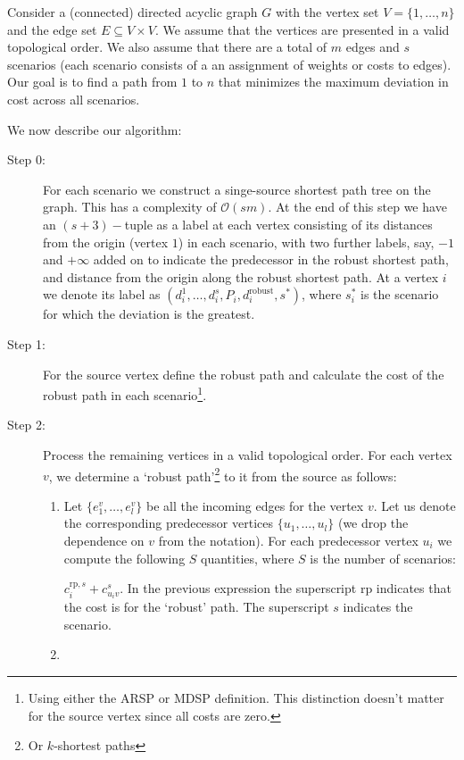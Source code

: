 \documentclass{article}
\begin{document}


Consider a (connected) directed acyclic graph $G$ with the vertex set $V = \{1, \dots, n\}$ and the edge set $E \subseteq V \times V$. We assume that the vertices are presented in a valid topological order. We also assume that there are a total of $m$ edges and $s$ scenarios (each scenario consists of a an assignment of weights or costs to edges). Our goal is to find a path from $1$ to $n$ that minimizes the maximum deviation in cost across all scenarios.\cite{some_refs}

We now describe our algorithm:
\begin{description}
\item[Step 0:] For each scenario we construct a singe-source shortest path tree on the graph. This has a complexity of $\mathcal{O}(s m)$. At the end of this step we have an $(s+3)-$tuple as a label at each vertex consisting of its distances from the origin (vertex $1$) in each scenario, with two further labels, say, $-1$ and $+\infty$ added on to indicate the predecessor in the robust shortest path, and distance from the origin along the robust shortest path. At a vertex $i$ we denote its label as $(d_i^1,\dots,d_i^s,P_i,d_i^{\textrm{robust}},s^{*})$, where $s_i^{*}$ is the scenario for which the deviation is the greatest.

\item[Step 1:] For the source vertex define the robust path and calculate the cost of the robust path in each scenario\footnote{Using either the ARSP or MDSP definition. This distinction doesn't matter for the source vertex since all costs are zero.}.

\item[Step 2:] Process the remaining vertices in a valid topological order. For each vertex $v$, we determine a `robust path'\footnote{Or $k$-shortest paths} to it from the source as follows:
\begin{enumerate}
\item Let $\{e^v_1,\dots,e^v_l\}$ be all the incoming edges for the vertex $v$. Let us denote the corresponding predecessor vertices $\{u_1,\dots,u_l\}$ (we drop the dependence on $v$ from the notation). For each predecessor vertex $u_i$ we compute the following $S$ quantities, where $S$ is the number of scenarios: \begin{comment}$c^{\textrm{sp},s}_i + c^s_{u_iv}$ and\end{comment} $c^{\textrm{rp},s}_i + c^s_{u_iv}$. In the previous expression the superscript $\textrm{rp}$ indicates that the cost is for the `robust' path. The superscript $s$ indicates the scenario.
\item 

\end{enumerate}
\end{description}
\end{document}
